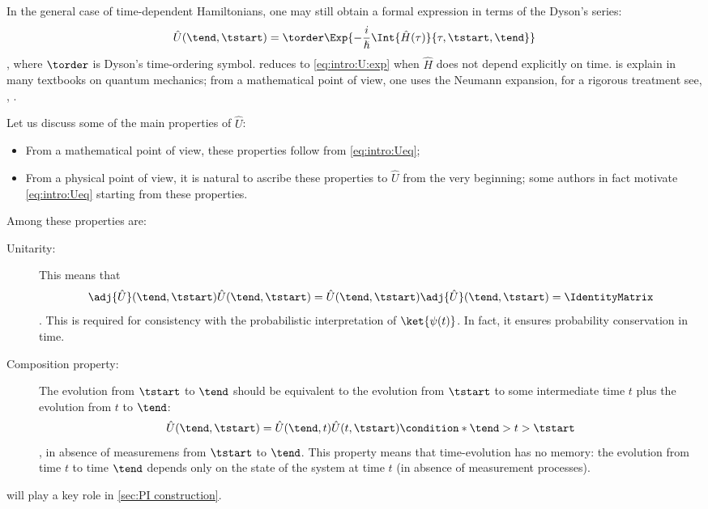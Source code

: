 In the general case of time-dependent Hamiltonians, one may still obtain a
formal expression in terms of the Dyson's series:
\begin{dmath}[label={intro:U:Texp}]
   \hat{U}(\tend, \tstart) = \torder\Exp{ - \frac{i}{\hslash}
      \Int{\hat{H}(\tau)}{\tau, \tstart, \tend}}
\end{dmath},
where $\torder$ is Dyson's time-ordering symbol. 
 reduces to \cref{eq:intro:U:exp} when $\hat{H}$ does not
depend explicitly on time.   is explain in many textbooks
on quantum mechanics; from  a mathematical point of view, one uses the Neumann
expansion, for a rigorous treatment see, \eg,
\textcite[\S~X.12]{Reed.Simon:1975}.


Let us discuss
some of the main properties of $\hat{U}$:
\begin{itemize}
   \item From a mathematical point of view, these properties follow from
      \cref{eq:intro:Ueq};
   \item From a physical point of view, it is natural to ascribe these
      properties to $\hat{U}$ from the very beginning; some authors in fact motivate
      \cref{eq:intro:Ueq} starting from these properties.
\end{itemize}
Among these properties are:
\begin{description}
   \item[Unitarity:]
This means that
\begin{dmath*}[compact]
   \adj{\hat{U}} (\tend, \tstart) \hat{U} (\tend, \tstart) =
   \hat{U} (\tend, \tstart) \adj{\hat{U}} (\tend, \tstart) = \IdentityMatrix
\end{dmath*}.
This is required for
      consistency  with 
the
probabilistic interpretation of $\ket{\psi(t)}$. In fact, it ensures probability
conservation in time.
   \item[Composition property:]
The evolution from $\tstart$ to $\tend$ should be equivalent to the evolution
from $\tstart$ to some intermediate time $t$ plus the evolution from $t$ to
$\tend$:
\begin{dmath}[label={intro:U:cl}]
      \hat{U}(\tend, \tstart) = \hat{U} (\tend, t) \hat{U} (t, \tstart)
      \condition*{\tend>t>\tstart}
   \end{dmath},
   in absence of measuremens from $\tstart$ to $\tend$.
This property means that time-evolution has no memory: the evolution
from time $t$ to
time $\tend$ depends only on the state of the system at time $t$ (in absence of
measurement processes).
\end{description}
\begin{remark}
     will play a key role in \cref{sec:PI construction}.
\end{remark}

